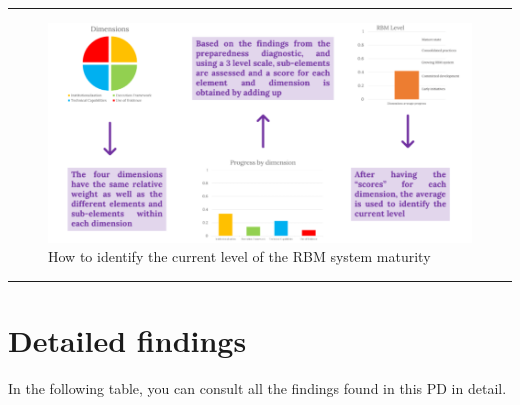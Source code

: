 \documentclass[
  10pt,
]{book}
\begin{document}
\begin{center}\rule{0.5\linewidth}{0.5pt}\end{center}

\begin{figure}

{\centering \includegraphics[width=1\linewidth]{./images/figure_8} 

}

\caption{How to identify the current level of the RBM system maturity}\label{fig:figure8}
\end{figure}

\begin{center}\rule{0.5\linewidth}{0.5pt}\end{center}

\hypertarget{appendixB}{%
\chapter{Detailed findings}\label{appendixB}}

In the following table, you can consult all the findings found in this PD in detail.
\end{document}
